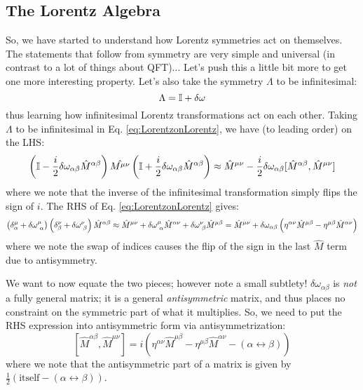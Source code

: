 \subsection{The Lorentz Algebra}
So, we have started to understand how Lorentz symmetries act on themselves. The statements that follow from symmetry are very simple and universal (in contrast to a lot of things about QFT)... Let's push this a little bit more to get one more interesting property. Let's also take the symmetry $\Lambda$ to be infinitesimal:
\begin{equation}
    \Lambda = \mathbb{I} + \delta\omega
\end{equation}
thus learning how infinitesimal Lorentz transformations act on each other. Taking $\Lambda$ to be infinitesimal in Eq. \eqref{eq:LorentzonLorentz}, we have (to leading order) on the LHS:
\begin{equation}
    \left(\mathbb{I} - \frac{i}{2}\delta\omega_{\alpha\beta}\hat{M}^{\alpha\beta}\right)\hat{M^{\mu\nu}}\left(\mathbb{I} + \frac{i}{2}\delta\omega_{\alpha\beta}\hat{M}^{\alpha\beta}\right) \approx \hat{M}^{\mu\nu} - \frac{i}{2}\delta\omega_{\alpha\beta}[\hat{M}^{\alpha\beta}, \hat{M}^{\mu\nu}]
\end{equation}
where we note that the inverse of the infinitesimal transformation simply flips the sign of $i$. The RHS of Eq. \eqref{eq:LorentzonLorentz} gives:
\begin{equation}
    \left(\delta^\mu_\alpha + \delta\omega^\mu_{\sp\alpha}\right)\left(\delta^\nu_\beta + \delta\omega^\nu_{\sp\beta}\right)\hat{M}^{\alpha\beta} \approx \hat{M}^{\mu\nu} + \delta\omega^\mu_{\sp\alpha}\hat{M}^{\alpha\nu} + \delta\omega^{\nu}_{\sp\beta}\hat{M}^{\mu\beta} = \hat{M}^{\mu\nu} + \delta\omega_{\alpha\beta}\left(\eta^{\alpha\nu}\hat{M}^{\mu\beta} - \eta^{\mu\beta}\hat{M}^{\alpha\nu}\right)
\end{equation}
where we note the swap of indices causes the flip of the sign in the last $\hat{M}$ term due to antisymmetry.

We want to now equate the two pieces; however note a small subtlety! $\delta\omega_{\alpha\beta}$ is \emph{not} a fully general matrix; it is a general \emph{antisymmetric} matrix, and thus places no constraint on the symmetric part of what it multiplies. So, we need to put the RHS expression into antisymmetric form via antisymmetrization:
\begin{equation}\label{eq:Lorentzalgebra}
    \boxed{[\hat{M}^{\alpha\beta}, \hat{M}^{\mu\nu}] = i\left(\eta^{\alpha\nu}\hat{M}^{\mu\beta} - \eta^{\mu\beta}\hat{M}^{\alpha\nu} - (\alpha \leftrightarrow \beta)\right)}
\end{equation}
where we note that the antisymmetric part of a matrix is given by $\frac{1}{2}(\text{itself} - (\alpha \leftrightarrow \beta))$.

